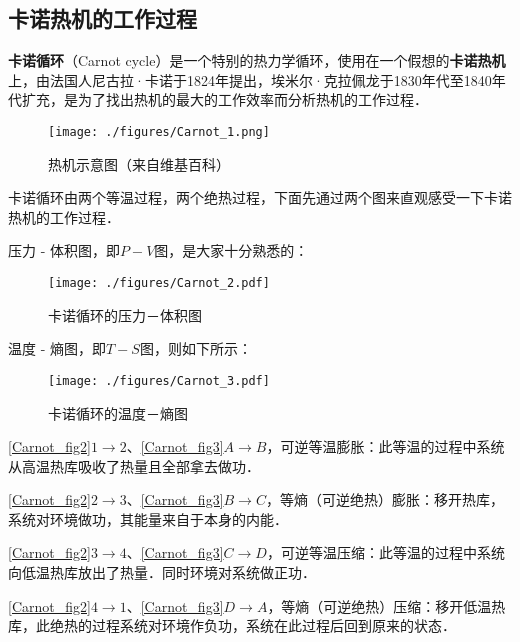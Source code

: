
\subsection{卡诺热机的工作过程}
\textbf{卡诺循环}（Carnot cycle）是一个特别的热力学循环，使用在一个假想的\textbf{卡诺热机}上，由法国人尼古拉·卡诺于1824年提出，埃米尔·克拉佩龙于1830年代至1840年代扩充，是为了找出热机的最大的工作效率而分析热机的工作过程．

\begin{figure}[ht]
\centering
\texttt{[image: ./figures/Carnot\_1.png]}
\caption{热机示意图（来自维基百科）} \label{Carnot_fig1}
\end{figure}
卡诺循环由两个等温过程，两个绝热过程，下面先通过两个图来直观感受一下卡诺热机的工作过程．

压力 - 体积图，即$P-V$图，是大家十分熟悉的：
\begin{figure}[ht]
\centering
\texttt{[image: ./figures/Carnot\_2.pdf]}
\caption{卡诺循环的压力－体积图} \label{Carnot_fig2}
\end{figure}

温度 - 熵图，即$T-S$图，则如下所示：
\begin{figure}[ht]
\centering
\texttt{[image: ./figures/Carnot\_3.pdf]}
\caption{卡诺循环的温度－熵图} \label{Carnot_fig3}
\end{figure}

\autoref{Carnot_fig2}$1\to 2$、\autoref{Carnot_fig3}$A\to B$，可逆等温膨胀：此等温的过程中系统从高温热库吸收了热量且全部拿去做功．

\autoref{Carnot_fig2}$2\to 3$、\autoref{Carnot_fig3}$B\to C$，等熵（可逆绝热）膨胀：移开热库，系统对环境做功，其能量来自于本身的内能．

\autoref{Carnot_fig2}$3\to 4$、\autoref{Carnot_fig3}$C\to D$，可逆等温压缩：此等温的过程中系统向低温热库放出了热量．同时环境对系统做正功．

\autoref{Carnot_fig2}$4\to 1$、\autoref{Carnot_fig3}$D\to A$，等熵（可逆绝热）压缩：移开低温热库，此绝热的过程系统对环境作负功，系统在此过程后回到原来的状态．


